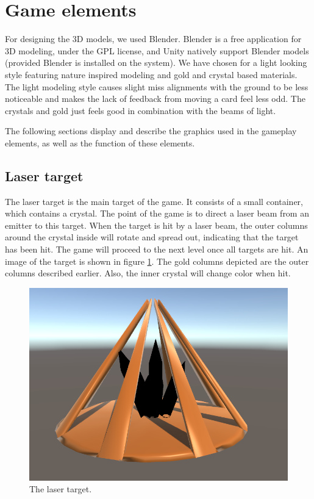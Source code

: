 	\section{Game elements} \label{sec:graphicaldesign}
		For designing the 3D models, we used Blender. Blender is a free application
		for 3D modeling, under the GPL license, and Unity natively support Blender 
		models (provided Blender is installed on the system). We have chosen for a 
		light looking style featuring nature inspired modeling and gold and crystal 
		based materials. The light modeling style causes slight miss alignments with 
		the ground to be less noticeable and makes the lack of feedback from moving a 
		card feel less odd. The crystals and gold just feels good in combination with 
		the beams of light.
		
		The following sections display and describe the graphics used in
		the gameplay elements, as well as the function of
		these elements.
		
		\subsection{Laser target} \label{ssec:lasertarget}
			The laser target is the main target of the game. It consists of
			a small container, which contains a crystal. The point of the
			game is to direct a laser beam from an emitter to this target.
			When the target is hit by a laser beam, the outer columns around
			the crystal inside will rotate and spread out, indicating that
			the target has been hit. The game will proceed to the
			next level once all targets are hit. An image of the target is shown in figure 
			\ref{fig:target}. The gold columns depicted are the outer columns
			described earlier. Also, the inner crystal will change color
			when hit.
			\begin{figure}[!ht]
				\centering
				\includegraphics[scale = 0.4]{Target}
				\caption{The laser target.}
				\label{fig:target}
			\end{figure}
			

